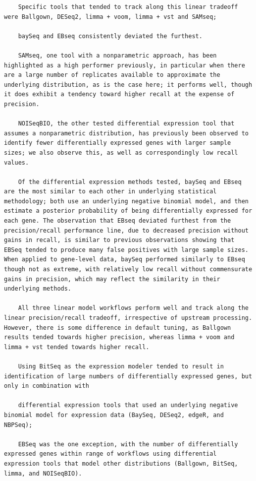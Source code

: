 \documentclass[
]{book}
\begin{document}
\begin{verbatim}
    Specific tools that tended to track along this linear tradeoff were Ballgown, DESeq2, limma + voom, limma + vst and SAMseq;

    baySeq and EBseq consistently deviated the furthest.

    SAMseq, one tool with a nonparametric approach, has been highlighted as a high performer previously, in particular when there are a large number of replicates available to approximate the underlying distribution, as is the case here; it performs well, though it does exhibit a tendency toward higher recall at the expense of precision.

    NOISeqBIO, the other tested differential expression tool that assumes a nonparametric distribution, has previously been observed to identify fewer differentially expressed genes with larger sample sizes; we also observe this, as well as correspondingly low recall values.

    Of the differential expression methods tested, baySeq and EBseq are the most similar to each other in underlying statistical methodology; both use an underlying negative binomial model, and then estimate a posterior probability of being differentially expressed for each gene. The observation that EBseq deviated furthest from the precision/recall performance line, due to decreased precision without gains in recall, is similar to previous observations showing that EBSeq tended to produce many false positives with large sample sizes. When applied to gene-level data, baySeq performed similarly to EBseq though not as extreme, with relatively low recall without commensurate gains in precision, which may reflect the similarity in their underlying methods.

    All three linear model workflows perform well and track along the linear precision/recall tradeoff, irrespective of upstream processing. However, there is some difference in default tuning, as Ballgown results tended towards higher precision, whereas limma + voom and limma + vst tended towards higher recall.

    Using BitSeq as the expression modeler tended to result in identification of large numbers of differentially expressed genes, but only in combination with

    differential expression tools that used an underlying negative binomial model for expression data (BaySeq, DESeq2, edgeR, and NBPSeq);

    EBSeq was the one exception, with the number of differentially expressed genes within range of workflows using differential expression tools that model other distributions (Ballgown, BitSeq, limma, and NOISeqBIO).


\end{verbatim}
\end{document}
